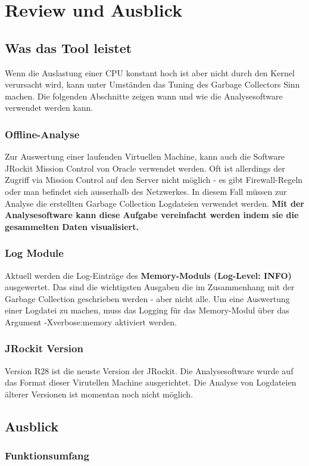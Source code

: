 \chapter{Review und Ausblick}\label{review}
\section{Was das Tool leistet}
Wenn die Auslastung einer CPU konstant hoch ist aber nicht durch den Kernel verursacht wird, kann unter Umständen das Tuning des Garbage Collectors Sinn machen. Die folgenden Abschnitte zeigen wann und wie die Analysesoftware verwendet werden kann.

\subsection{Offline-Analyse}
Zur Auswertung einer laufenden Virtuellen Machine, kann auch die Software JRockit Mission Control von Oracle verwendet werden. Oft ist allerdings der Zugriff via Mission Control auf den Server nicht möglich - es gibt Firewall-Regeln oder man befindet sich ausserhalb des Netzwerkes. In diesem Fall müssen zur Analyse die erstellten Garbage Collection Logdateien verwendet werden. \textbf{Mit der Analysesoftware kann diese Aufgabe vereinfacht werden indem sie die gesammelten Daten visualisiert.}

\subsection{Log Module}
Aktuell werden die Log-Einträge des \textbf{Memory-Moduls  (Log-Level: INFO)} ausgewertet. Das sind die wichtigsten Ausgaben die im Zusammenhang mit der Garbage Collection geschrieben werden - aber nicht alle. Um eine Auswertung einer Logdatei zu machen, muss das Logging für das Memory-Modul über das Argument -Xverbose:memory aktiviert werden.

\subsection{JRockit Version}
Version R28 ist die neuste Version der JRockit. Die Analysesoftware wurde auf das Format dieser Virutellen Machine ausgerichtet. Die Analyse von Logdateien älterer Versionen ist momentan noch nicht möglich.

\section{Ausblick}
\subsection{Funktionsumfang}
